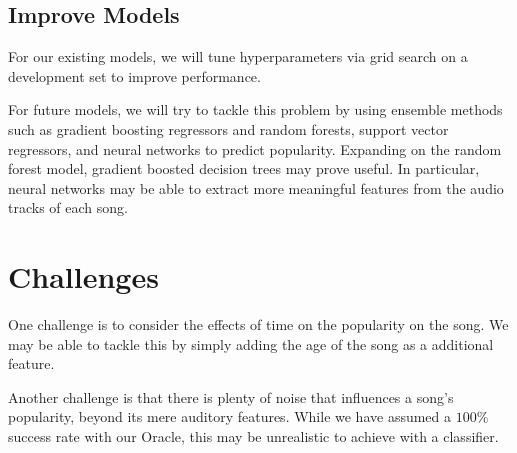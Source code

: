 \documentclass[journal]{IEEEtran}
\begin{document}
\subsection{Improve Models}
For our existing models, we will tune hyperparameters via grid search on a development set to improve performance.

For future models, we will try to tackle this problem by using ensemble methods such as gradient boosting regressors and random forests, support vector regressors, and neural networks to predict popularity. Expanding on the random forest model, gradient boosted decision trees may prove useful. In particular, neural networks may be able to extract more meaningful features from the audio tracks of each song.

\section{Challenges}
One challenge is to consider the effects of time on the popularity on the song. We may be able to tackle this by simply adding the age of the song as a additional feature.

Another challenge is that there is plenty of noise that influences a song's popularity, beyond its mere auditory features. While we have assumed a $100\%$ success rate with our Oracle, this may be unrealistic to achieve with a classifier.



%
%
%


\end{document}
